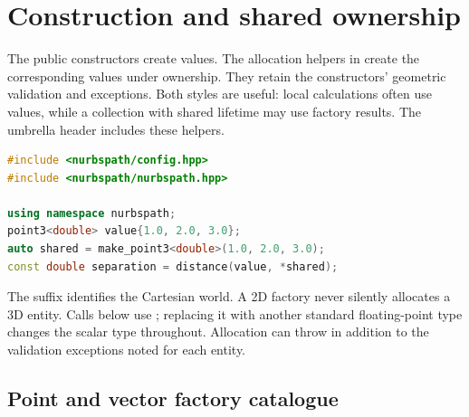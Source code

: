 \chapter{Construction and shared ownership}
\label{chap:creators}

The public constructors create values. The allocation helpers in
 create the corresponding values under
 ownership. They retain the constructors' geometric
validation and exceptions. Both styles are useful: local calculations often
use values, while a collection with shared lifetime may use factory results.
The umbrella header includes these helpers.

\begin{lstlisting}[language=C++]
#include <nurbspath/config.hpp>
#include <nurbspath/nurbspath.hpp>

using namespace nurbspath;
point3<double> value{1.0, 2.0, 3.0};
auto shared = make_point3<double>(1.0, 2.0, 3.0);
const double separation = distance(value, *shared);
\end{lstlisting}

The suffix identifies the Cartesian world. A 2D factory never silently
allocates a 3D entity. Calls below use ; replacing it with
another standard floating-point type changes the scalar type throughout.
Allocation can throw  in addition to the validation
exceptions noted for each entity.

\section{Point and vector factory catalogue}

